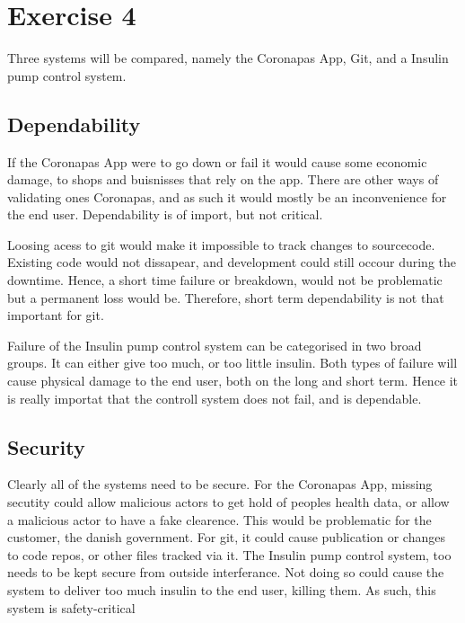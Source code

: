 \section{Exercise 4}
Three systems will be compared, namely the Coronapas App, Git, and a Insulin pump control system.

\subsection{Dependability}
If the Coronapas App were to go down or fail it would cause some economic damage, to shops and buisnisses that rely on the app.
There are other ways of validating ones Coronapas, and as such it would mostly be an inconvenience for the end user. 
Dependability is of import, but not critical.

Loosing acess to git would make it impossible to track changes to sourcecode.
Existing code would not dissapear, and development could still occour during the downtime.
Hence, a short time failure or breakdown, would not be problematic but a permanent loss would be.
Therefore, short term dependability is not that important for git.


Failure of the Insulin pump control system can be categorised in two broad groups.
It can either give too much, or too little insulin.
Both types of failure will cause physical damage to the end user, both on the long and short term.
Hence it is really importat that the controll system does not fail, and is dependable.


\subsection{Security}
Clearly all of the systems need to be secure.
For the Coronapas App, missing secutity could allow malicious actors to get hold of peoples health data, or allow a malicious actor to have a fake clearence.
This would be problematic for the customer, the danish government.
For git, it could cause publication or changes to code repos, or other files tracked via it.
The Insulin pump control system, too needs to be kept secure from outside interferance.
Not doing so could cause the system to deliver too much insulin to the end user, killing them.
As such, this system is safety-critical

